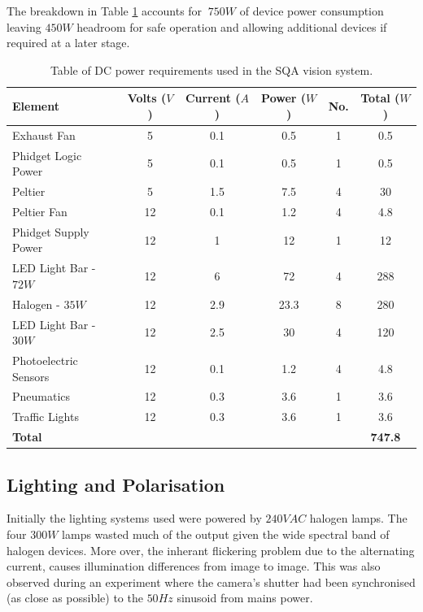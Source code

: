\documentclass[fleqn,twoside,12pt]{report}
\begin{document}
The breakdown in Table \ref{tab:DC_power_table} accounts for $~750W$ of device power consumption leaving $450W$ headroom for safe operation and allowing additional devices if required at a later stage.

\begin{table}[h]
	\centering
	\caption{Table of DC power requirements used in the SQA vision system.}
	\label{tab:DC_power_table}
	\begin{tabular}{lccccc}
		
		\toprule
		\textbf{Element} & \textbf{Volts ($V$)} & \textbf{Current ($A$)} & \textbf{Power ($W$)} & \textbf{No.} & \textbf{Total ($W$)}\\[8pt]
		\midrule
		
		Exhaust Fan & 5 & 0.1 & 0.5 & 1 & 0.5 \\[4pt]
		\midrule
		Phidget Logic Power  & 5 & 0.1 & 0.5 & 1 & 0.5 \\[4pt]
		\midrule
		Peltier & 5 & 1.5 & 7.5 & 4 & 30 \\[4pt]
		\midrule
		Peltier Fan & 12 & 0.1 & 1.2 & 4 & 4.8 \\[4pt]
		\midrule
		Phidget Supply Power & 12 & 1 & 12 & 1 & 12 \\[4pt]
		\midrule
		LED Light Bar - $72W$ & 12 & 6 & 72 & 4 & 288 \\[4pt]
		\midrule
		Halogen - $35W$ & 12 & 2.9 & 23.3 & 8 & 280 \\[4pt]
		\midrule
		LED Light Bar - $30W$ & 12 & 2.5 & 30 & 4 & 120 \\[4pt]
		\midrule
		Photoelectric Sensors & 12 & 0.1 & 1.2 & 4 & 4.8 \\[4pt]
		\midrule
		Pneumatics & 12 & 0.3 & 3.6 & 1 & 3.6 \\[4pt]
		\midrule
		Traffic Lights & 12 & 0.3 & 3.6 & 1 & 3.6 \\[4pt]
		
		\midrule\midrule
		\textbf{Total } &  &  &  &  & \textbf{747.8}\\[8pt]
		\bottomrule
		
	\end{tabular}
\end{table}



\subsection{Lighting and Polarisation}

Initially the lighting systems used were powered by $240VAC$ halogen lamps. The four $300W$ lamps wasted much of the output given the wide spectral band of halogen devices. More over, the inherant flickering problem due to the alternating current, causes illumination differences from image to image. This was also observed during an experiment where the camera's shutter had been synchronised (as close as possible) to the $50Hz$ sinusoid from mains power.
\end{document}
